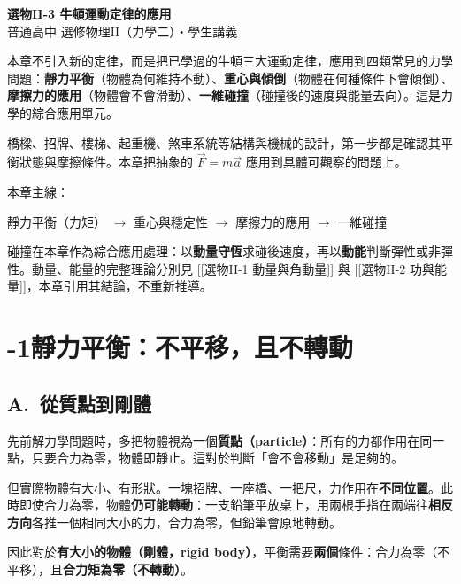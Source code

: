 \documentclass[11pt]{article}
\begin{document}
\begin{center}
{\sffamily\Huge\bfseries 選物II-3 牛頓運動定律的應用}\\[3pt]
{\sffamily\large 普通高中 選修物理II（力學二）・學生講義}
\end{center}
\vspace{0.6em}

本章不引入新的定律，而是把已學過的牛頓三大運動定律，應用到四類常見的力學問題：\textbf{靜力平衡}（物體為何維持不動）、\textbf{重心與傾倒}（物體在何種條件下會傾倒）、\textbf{摩擦力的應用}（物體會不會滑動）、\textbf{一維碰撞}（碰撞後的速度與能量去向）。這是力學的綜合應用單元。

橋樑、招牌、樓梯、起重機、煞車系統等結構與機械的設計，第一步都是確認其平衡狀態與摩擦條件。本章把抽象的 $\vec F=m\vec a$ 應用到具體可觀察的問題上。

\medskip
本章主線：

\begin{center}
靜力平衡（力矩） $\rightarrow$ 重心與穩定性 $\rightarrow$ 摩擦力的應用 $\rightarrow$ 一維碰撞
\end{center}

\medskip
碰撞在本章作為綜合應用處理：以\textbf{動量守恆}求碰後速度，再以\textbf{動能}判斷彈性或非彈性。動量、能量的完整理論分別見 [[選物II-1 動量與角動量]] 與 [[選物II-2 功與能量]]，本章引用其結論，不重新推導。

\section*{-1\quad 靜力平衡：不平移，且不轉動}

\subsection*{\sffamily A.\ 從質點到剛體}

先前解力學問題時，多把物體視為一個\textbf{質點（particle）}：所有的力都作用在同一點，只要合力為零，物體即靜止。這對於判斷「會不會移動」是足夠的。

但實際物體有大小、有形狀。一塊招牌、一座橋、一把尺，力作用在\textbf{不同位置}。此時即使合力為零，物體\textbf{仍可能轉動}：一支鉛筆平放桌上，用兩根手指在兩端往\textbf{相反方向}各推一個相同大小的力，合力為零，但鉛筆會原地轉動。

因此對於\textbf{有大小的物體（剛體，rigid body）}，平衡需要\textbf{兩個}條件：合力為零（不平移），且\textbf{合力矩為零（不轉動）}。
\end{document}
